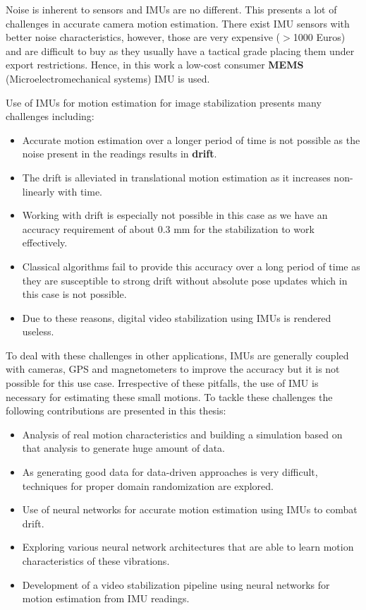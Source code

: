 Noise is inherent to sensors and IMUs are no different. This presents a lot of challenges in accurate camera motion estimation. There exist IMU sensors with better noise characteristics, however, those are very expensive ($ > $1000 Euros) and are difficult to buy as they usually have a tactical grade placing them under export restrictions. Hence, in this work a low-cost consumer \textbf{MEMS} (Microelectromechanical systems) IMU is used. 

Use of IMUs for motion estimation for image stabilization presents many challenges including:

\begin{itemize}
    \item Accurate motion estimation over a longer period of time is not possible as the noise present in the readings results in \textbf{drift}.
    
    \item The drift is alleviated in translational motion estimation as it increases non-linearly with time.
    
    \item Working with drift is especially not possible in this case as we have an accuracy requirement of about 0.3 mm for the stabilization to work effectively.

    \item Classical algorithms fail to provide this accuracy over a long period of time as they are susceptible to strong drift without absolute pose updates which in this case is not possible.

    \item Due to these reasons, digital video stabilization using IMUs is rendered useless.
\end{itemize}
    
To deal with these challenges in other applications, IMUs are generally coupled with cameras, GPS and magnetometers to improve the accuracy but it is not possible for this use case. Irrespective of these pitfalls, the use of IMU is necessary for estimating these small motions. To tackle these challenges the following contributions are presented in this thesis:

\begin{itemize}
    \item Analysis of real motion characteristics and building a simulation based on that analysis to generate huge amount of data.

    \item As generating good data for data-driven approaches is very difficult, techniques for proper domain randomization are explored.

    \item Use of neural networks for accurate motion estimation using IMUs to combat drift.

    \item Exploring various neural network architectures that are able to learn motion characteristics of these vibrations.

    \item Development of a video stabilization pipeline using neural networks for motion estimation from IMU readings.
\end{itemize}


